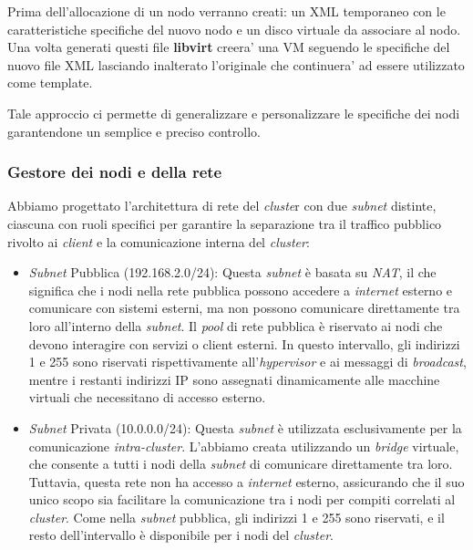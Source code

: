 Prima dell'allocazione di un nodo verranno creati: un XML temporaneo con le caratteristiche 
specifiche del nuovo nodo e un disco virtuale da associare al nodo. 
Una volta generati questi file \textbf{libvirt} creera' una VM seguendo le specifiche del 
nuovo file XML lasciando inalterato l'originale che continuera' ad essere utilizzato come template.

Tale approccio ci permette di generalizzare e personalizzare le specifiche dei nodi garantendone
un semplice e preciso controllo.



\subsubsection{Gestore dei nodi e della rete}
Abbiamo progettato l'architettura di rete del \textit{cluste}r con due \textit{subnet} distinte, ciascuna con ruoli specifici per garantire la separazione tra il traffico pubblico rivolto ai \textit{client} e la comunicazione interna del \textit{cluster}:
\begin{itemize}
  \item \textit{Subnet} Pubblica (192.168.2.0/24): Questa \textit{subnet} è basata su \textit{NAT}, il che significa che i nodi nella rete pubblica possono accedere a \textit{internet} esterno e comunicare con sistemi esterni, 
    ma non possono comunicare direttamente tra loro all'interno della \textit{subnet}. Il \textit{pool} di rete pubblica è riservato ai nodi che devono interagire con servizi o client esterni. In questo intervallo, 
    gli indirizzi 1 e 255 sono riservati rispettivamente all'\textit{hypervisor} e ai messaggi di \textit{broadcast}, mentre i restanti indirizzi IP sono assegnati dinamicamente alle macchine virtuali che necessitano di 
    accesso esterno.
  \item \textit{Subnet} Privata (10.0.0.0/24): Questa \textit{subnet} è utilizzata esclusivamente per la comunicazione \textit{intra-cluster}. L'abbiamo creata utilizzando un \textit{bridge} virtuale, che consente a tutti i 
    nodi della \textit{subnet} di comunicare direttamente tra loro. Tuttavia, questa rete non ha accesso a \textit{internet} esterno, assicurando che il suo unico scopo sia facilitare la comunicazione tra i nodi per compiti 
    correlati al \textit{cluster}. Come nella \textit{subnet} pubblica, gli indirizzi 1 e 255 sono riservati, e il resto dell'intervallo è disponibile per i nodi del \textit{cluster}.
\end{itemize}


